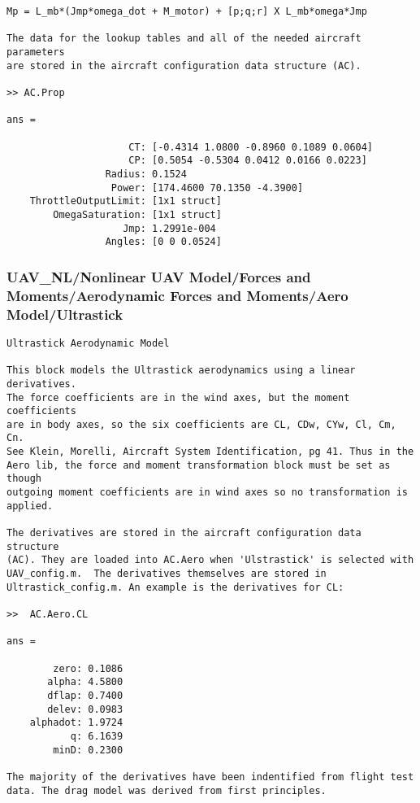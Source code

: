 \documentclass[12pt]{article}
\begin{document}
\begin{verbatim}
Mp = L_mb*(Jmp*omega_dot + M_motor) + [p;q;r] X L_mb*omega*Jmp 

The data for the lookup tables and all of the needed aircraft parameters
are stored in the aircraft configuration data structure (AC).

>> AC.Prop

ans = 

                     CT: [-0.4314 1.0800 -0.8960 0.1089 0.0604]
                     CP: [0.5054 -0.5304 0.0412 0.0166 0.0223]
                 Radius: 0.1524
                  Power: [174.4600 70.1350 -4.3900]
    ThrottleOutputLimit: [1x1 struct]
        OmegaSaturation: [1x1 struct]
                    Jmp: 1.2991e-004
                 Angles: [0 0 0.0524]

\end{verbatim}

\subsubsection{UAV\_NL/Nonlinear UAV Model/Forces and Moments/Aerodynamic Forces and Moments/Aero Model/Ultrastick}
\begin{verbatim}
Ultrastick Aerodynamic Model

This block models the Ultrastick aerodynamics using a linear derivatives.
The force coefficients are in the wind axes, but the moment coefficients 
are in body axes, so the six coefficients are CL, CDw, CYw, Cl, Cm, Cn. 
See Klein, Morelli, Aircraft System Identification, pg 41. Thus in the 
Aero lib, the force and moment transformation block must be set as though
outgoing moment coefficients are in wind axes so no transformation is 
applied.

The derivatives are stored in the aircraft configuration data structure
(AC). They are loaded into AC.Aero when 'Ulstrastick' is selected with
UAV_config.m.  The derivatives themselves are stored in 
Ultrastick_config.m. An example is the derivatives for CL:

>>  AC.Aero.CL

ans = 

        zero: 0.1086
       alpha: 4.5800
       dflap: 0.7400
       delev: 0.0983
    alphadot: 1.9724
           q: 6.1639
        minD: 0.2300

The majority of the derivatives have been indentified from flight test
data. The drag model was derived from first principles.

\end{verbatim}
\end{document}
